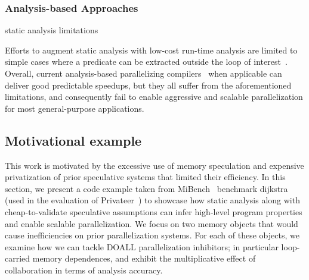 

\subsubsection{Analysis-based Approaches}

static analysis limitations

Efforts to augment static analysis with low-cost run-time analysis are limited
to simple cases where a predicate can be extracted outside the loop of
interest~\cite{hybrid_analysis, suif:94:stanford, polaris}.
%
Overall, current analysis-based parallelizing
compilers~\cite{campanoni:2012:iscgo, raman:2008:iscgo, suif:94:stanford,
polaris, sensitivity} when applicable can deliver good predictable speedups, but
they all suffer from the aforementioned limitations, and consequently fail to
enable aggressive and scalable parallelization for most general-purpose
applications.


\subsection{Motivational example}

This work is motivated by the excessive use of memory speculation and expensive
privatization of prior speculative systems that limited their efficiency.
%
In this section, we present a code example taken from MiBench~\cite{} benchmark
dijkstra (used in the evaluation of Privateer~\cite{}) to showcase how static
analysis along with cheap-to-validate speculative assumptions can infer
high-level program properties and enable scalable parallelization.
%
We focus on two memory objects that would cause inefficiencies on prior
parallelization systems.
%
For each of these objects, we examine how we can tackle DOALL parallelization
inhibitors; in particular loop-carried memory dependences, and exhibit the
multiplicative effect of collaboration in terms of analysis accuracy.

